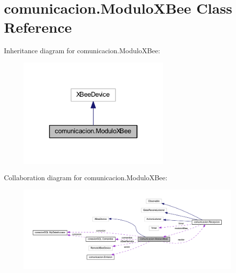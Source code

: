 \hypertarget{classcomunicacion_1_1_modulo_x_bee}{}\section{comunicacion.\+Modulo\+X\+Bee Class Reference}
\label{classcomunicacion_1_1_modulo_x_bee}


Inheritance diagram for comunicacion.\+Modulo\+X\+Bee\+:
\nopagebreak
\begin{figure}[H]
\begin{center}
\leavevmode
\includegraphics[width=214pt]{classcomunicacion_1_1_modulo_x_bee__inherit__graph}
\end{center}
\end{figure}


Collaboration diagram for comunicacion.\+Modulo\+X\+Bee\+:
\nopagebreak
\begin{figure}[H]
\begin{center}
\leavevmode
\includegraphics[width=350pt]{classcomunicacion_1_1_modulo_x_bee__coll__graph}
\end{center}
\end{figure}
